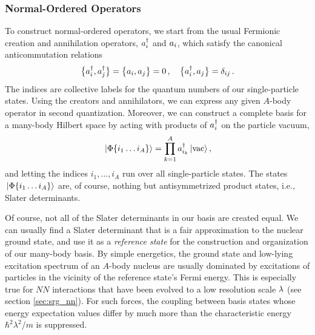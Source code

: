 {\subsubsection{\label{sec:nord_ops}Normal-Ordered Operators}
To construct normal-ordered operators, we start from the usual Fermionic
creation and annihilation operators, $a^\dag_i$ and $a_i$, which satisfy
the canonical anticommutation relations
\begin{equation}
   \big\{ {a^\dag_i}, {a^\dag_j} \big\}  =  \big\{ {a_i}, {a_j} \big\}  = 0\,,\quad  \big\{ {a^\dag_i}, {a_j} \big\} =\delta_{ij}\,.
\end{equation}
The indices are collective labels for the quantum numbers of our single-particle 
states. Using the creators and annihilators, we can express any given $A$-body 
operator in second quantization. Moreover, we can construct a complete basis 
for a many-body Hilbert space by acting with products of $a^\dag_i$ on the particle 
vacuum,
\begin{equation}\label{eq:vacbasis}
  \ket{\Phi\{i_1\ldots i_A\}}=\prod_{k=1}^A\aaO_{i_k}\ket{\text{vac}}\,,
\end{equation}
and letting the indices $i_1,\ldots,i_A$ run over all single-particle states.
The states $\,|{\Phi\{i_1\ldots i_A\}}\rangle$ are, of course, nothing but 
antisymmetrized product states, i.e., Slater determinants.

Of course, not all of the Slater determinants in our basis are created equal. 
We can usually find a Slater determinant that is a fair approximation 
to the nuclear ground state, and use it as a \emph{reference state} for the 
construction and organization of our many-body basis. By simple energetics, the 
ground state and low-lying excitation spectrum of an $A$-body nucleus are usually 
dominated by excitations of particles in the vicinity of the reference state's 
Fermi energy. This is especially true for $NN$ interactions that have
been evolved to a low resolution scale $\lambda$ (see section 
\ref{sec:srg_nn}). For such forces, the coupling between basis states whose
energy expectation values differ by much more than the characteristic energy 
$\hbar^2\lambda^2/m$ is suppressed. 

}
